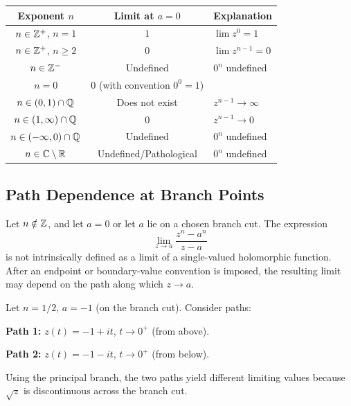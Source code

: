 \begin{center}
\renewcommand{\arraystretch}{1.4}
\begin{tabular}{|c|c|l|}
\hline
\textbf{Exponent $n$} & \textbf{Limit at $a = 0$} & \textbf{Explanation} \\
\hline
$n \in \mathbb{Z}^+$, $n = 1$ & $1$ & $\lim z^0 = 1$ \\
$n \in \mathbb{Z}^+$, $n \geq 2$ & $0$ & $\lim z^{n-1} = 0$ \\
$n \in \mathbb{Z}^-$ & Undefined & $0^n$ undefined \\
$n = 0$ & $0$ (with convention $0^0 = 1$) & \\
$n \in (0,1) \cap \mathbb{Q}$ & Does not exist & $z^{n-1} \to \infty$ \\
$n \in (1,\infty) \cap \mathbb{Q}$ & $0$ & $z^{n-1} \to 0$ \\
$n \in (-\infty, 0) \cap \mathbb{Q}$ & Undefined & $0^n$ undefined \\
$n \in \mathbb{C} \setminus \mathbb{R}$ & Undefined/Pathological & $0^n$ undefined \\
\hline
\end{tabular}
\end{center}

\subsection{Path Dependence at Branch Points}

\begin{theorem}
Let $n \notin \mathbb{Z}$, and let $a = 0$ or let $a$ lie on a chosen branch cut. The expression
\begin{equation}
\lim_{z \to a} \frac{z^n - a^n}{z - a}
\end{equation}
is not intrinsically defined as a limit of a single-valued holomorphic function.
After an endpoint or boundary-value convention is imposed, the resulting limit
may depend on the path along which $z \to a$.
\end{theorem}

\begin{example}
Let $n = 1/2$, $a = -1$ (on the branch cut). Consider paths:

\textbf{Path 1:} $z(t) = -1 + it$, $t \to 0^+$ (from above).

\textbf{Path 2:} $z(t) = -1 - it$, $t \to 0^+$ (from below).

Using the principal branch, the two paths yield different limiting values because $\sqrt{z}$ is discontinuous across the branch cut.
\end{example}

